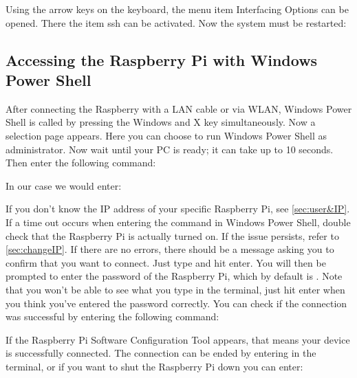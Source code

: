 
\medskip


Using the arrow keys on the keyboard, the menu item \glqq Interfacing Options\grqq{} can be opened. There
the item \glqq ssh\grqq{} can be activated. Now the system must be restarted:

\medskip


\subsection {Accessing the Raspberry Pi with Windows Power Shell}

After connecting the Raspberry with a LAN cable or via WLAN, Windows Power Shell is called by pressing the Windows and X key simultaneously. Now a selection page appears. Here you can choose to run Windows Power Shell as administrator. Now wait until your PC is ready; it can take up to 10 seconds. Then enter the following command:

\medskip


\medskip

In our case we would enter:

\medskip


\medskip

If you don't know the IP address of your specific Raspberry Pi, see \autoref{sec:user&IP}. If a time out occurs when entering the command in Windows Power Shell, double check that the Raspberry Pi is actually turned on. If the issue persists, refer to \autoref{sec:changeIP}. If there are no errors, there should be a message asking you to confirm that you want to connect. Just type  and hit enter. You will then be prompted to enter the password of the Raspberry Pi, which by default is . Note that you won't be able to see what you type in the terminal, just hit enter when you think you've entered the password correctly. You can check if the connection was successful by entering the following command:

\medskip


\medskip

If the Raspberry Pi Software Configuration Tool appears, that means your device is successfully connected. The connection can be ended by entering  in the terminal, or if you want to shut the Raspberry Pi down you can enter:

